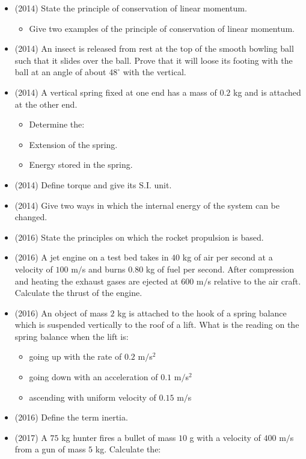 \documentclass{article}
\begin{document}
\begin{itemize}
\item (2014)  State the principle of conservation of linear momentum. 
 \begin{itemize}
\item Give two examples of the principle of conservation of linear momentum. 
\end{itemize}
\item (2014)  An insect is released from rest at the top of the smooth bowling ball such that it slides over the ball. Prove that it will loose its footing with the ball at an angle of about $ 48^{\circ}$ with the vertical.
\item (2014)  A vertical spring fixed at one end has a mass of $ 0.2$ kg and is attached at the other end.
 \begin{itemize}
\item Determine the:
\item Extension of the spring.
\item Energy stored in the spring.
\end{itemize}
\item (2014)  Define torque and give its S.I. unit.
\item (2014)  Give two ways in which the internal energy of the system can be changed.
\item (2016)  State the principles on which the rocket propulsion is based. 
\item (2016)  A jet engine on a test bed takes in $ 40$ kg of air per second at a velocity of $ 100$ m$/$s  and burns $ 0.80$ kg of fuel per second. After compression and heating the exhaust gases are ejected at $ 600$ m$/$s relative to the air craft. Calculate the thrust of the engine.
\item (2016)  An object of mass $ 2$ kg is attached to the hook of a spring balance which is suspended vertically to the roof of a lift.  What is the reading on the spring balance when the lift is:
 \begin{itemize}
\item going up with the rate of $ 0.2$ m$/$s$ ^{2}$
\item going down with an acceleration of $ 0.1$ m$/$s$ ^{2}$
\item ascending with uniform velocity of $ 0.15$ m$/$s
\end{itemize}
\item (2016)  Define the term inertia.
\item (2017)  A $ 75$ kg hunter fires a bullet of mass $ 10$ g with a velocity of $ 400$ m$/$s from a gun of mass $ 5$ kg. Calculate the:

\end{itemize}
\end{document}
